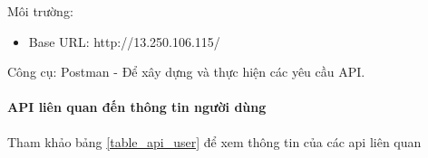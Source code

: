 Môi trường: 

\begin{adjustwidth}{1.5em}{}
\begin{itemize}
  \item Base URL: http://13.250.106.115/
\end{itemize}
\end{adjustwidth}

Công cụ: Postman - Để xây dựng và thực hiện các yêu cầu API.



\paragraph{API liên quan đến thông tin người dùng}
\mbox{}

Tham khảo bảng \ref{table_api_user} để xem thông tin của các api liên quan

